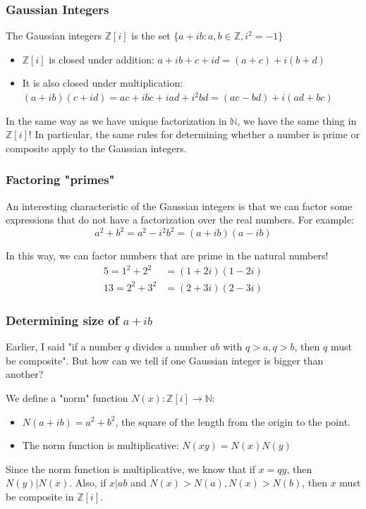 \documentclass{beamer}
\begin{document}
\begin{frame}
	\frametitle{Gaussian Integers}
	The Gaussian integers $\mathbb{Z}[i]$ is the set 
	$\{a+ib:a, b \in \mathbb{Z}, i^2 = -1 \}$

	\begin{itemize}
		\item $\mathbb{Z}[i]$ is closed under addition: $a+ib + c+id = (a+c) + i(b+d)$
		\item It is also closed under multiplication:
			$(a+ib)(c+id) = ac + ibc + iad + i^2bd = (ac-bd) + i(ad+bc)$
	\end{itemize}

	In the same way as we have unique factorization in $\mathbb{N}$, we have the same thing in
	$\mathbb{Z}[i]$! In particular, the same rules for determining whether a number is prime or
	composite apply to the Gaussian integers.
\end{frame}

\begin{frame}
	\frametitle{Factoring "primes"}

	An interesting characteristic of the Gaussian integers is that we can factor some
	expressions that do not have a factorization over the real numbers. For example:
	\[a^2 + b^2 = a^2 - i^2b^2 = (a+ib)(a-ib) \]

	In this way, we can factor numbers that are prime in the natural numbers!
	\begin{align*}
		5 = 1^2 + 2^2 &= (1+2i)(1-2i) \\
		13 = 2^2 + 3^2 &= (2+3i)(2-3i)
	\end{align*}
\end{frame}

\begin{frame}
	\frametitle{Determining size of $a+ib$}

	Earlier, I said "if a number $q$ divides a number $ab$ with $q>a, q>b$, then $q$ must be composite".
	But how can we tell if one Gaussian integer is bigger than another?

	We define a "norm" function $N(x):\mathbb{Z}[i]\rightarrow\mathbb{N}$:
	\begin{itemize}
		\item $N(a+ib) = a^2 + b^2$, the square of the length from the origin to the point.
		\item The norm function is multiplicative: $N(xy) = N(x)N(y)$
	\end{itemize}

	Since the norm function is multiplicative, we know that if $x = qy$, then $N(y)|N(x)$.
	Also, if $x | ab$ and $N(x) > N(a), N(x) > N(b)$, then $x$ must be composite in $\mathbb{Z}[i]$.
\end{frame}
\end{document}
